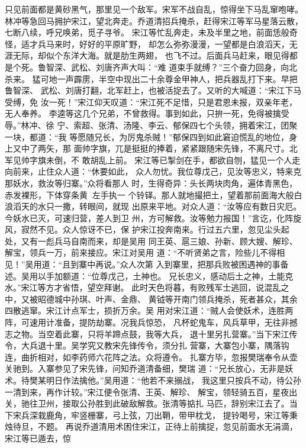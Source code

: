 只见前面都是黄砂黑气，那里见一个敌军。宋军不战自乱，惊得坐下马乱窜咆哮。
林冲等急回马拥护宋江，望北奔走。乔道清招兵掩杀，赶得宋江等军马星落云散，
七断八续，呼兄唤弟，觅子寻爷。
宋江等忙乱奔走，未及半里之地，前面恁般奇怪，适才兵马来时，好好的平原旷野，
却怎么弥弥漫漫，一望都是白浪滔天，无涯无际，却似个东洋大海。就是肋生两翅，
也飞不过。后面兵马赶来，眼见得都是个死。鲁智深、武松、刘唐齐声大叫：“难
道束手就缚？”三个奋力回身，向北杀来。
猛可地一声霹雳，半空中现出二十余尊金甲神人，把兵器乱打下来。早把鲁智深、
武松、刘唐打翻，北军赶上，也被活捉去了。又听的大喊道：“宋江下马受缚，免
汝一死！”宋江仰天叹道：“宋江死不足惜，只是君恩未报，双亲年老，无人奉养。
李逵等这几个兄弟，不曾救得。事到如此，只拚一死，免得被擒受辱。”林冲、徐
宁、索超、张清、汤隆、李云、郁保四七个头领，拥着宋江，团聚一块，都道：“我
等愿随兄长，为厉鬼杀贼！”郁保四到如此窘迫慌乱的地位，身上又中了两矢，那
面帅字旗，兀是挺挺的捧着，紧紧跟随宋先锋，不离尺寸。北军见帅字旗未倒，不
敢胡乱上前。
宋江等已掣剑在手，都欲自刎，猛见一个人走向前来，止住众人道：“休要如此，
众人勿忧。我位尊戊己，见汝等忠义，特来克那妖水，救汝等归寨。”众将看那人
时，生得奇异：头长两块肉角，遍体青黑色，赤发裸形，下体穿条黄，左手执一
个铃铎。那人就地撮把土，望着那前面海大般白浪滔天的水只一撒，转眼间，就现
出原来平地。对众人道：“汝等应有数日灾厄。今妖水已灭，可速归营，差人到卫
州，方可解救。汝等勉力报国！”言讫，化阵旋风，寂然不见。众人惊讶不已，保
护宋江投奔南来。行过五六里，忽见尘头起处，又有一彪兵马自南而来，却是吴用
同王英、扈三娘、孙新、顾大嫂、解珍、解宝，领兵一万，前来接应。宋江对吴用
道：“不听贤弟之言，险些儿不得相见！”吴用道：“且到寨中再说。”众人次第
入到寨里，把那兵败被困遇神的事备述。吴用以手加额道：“位尊戊己，土神也。
兄长忠义，感动后土之神，土能克水。”宋江等方才省悟，望空拜谢。
此时天色将暮，有败残军士逃回，说混乱之中，又被昭德城中孙琪、叶声、金鼎、
黄钺等开南门领兵掩杀，死者甚众，其余四散逃窜。宋江计点军士，损折万余。吴
用对宋江道：“贼人会使妖术，连胜两阵，可速用计准备，提防劫寨。况我兵惊恐，
凡杯蛇鬼车，风兵草甲，无往非撼志之物。当空着此寨，只将羊蹄点鼓，我等大兵，
退十里另扎营寨。”当下宋江传令，大兵退十里。吴学究又教宋先锋传令，须分扎
营寨，大寨包小寨，隅落钩连，曲折相对，如李药师六花阵之法。众将遵令。
扎寨方毕，忽报樊瑞奉令从壶关驰到。入寨参见了宋先锋，问知乔道清备细，樊瑞
道：“兄长放心，无非是妖术。待樊某明日作法擒他。”吴用道：“他若不来搦战，
我这里只按兵不动，待公孙一清到来，再作计较。”宋江便令张清、王英、解珍、
解宝，领轻骑五百，星夜出关，驰往卫州，接取公孙胜到此破敌解救。张清等掂扎
马匹，辞别宋江去了。当下宋兵深栽鹿角，牢竖栅寨，弓上弦，刀出鞘，带甲枕戈，
提铃喝号，宋江等秉烛待旦，不题。
再说乔道清用术困住宋江，正待上前擒捉，忽见前面水无涓滴，宋江等已遁去，惊
